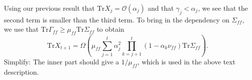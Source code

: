 Using our previous result that $\mathrm{Tr} X_j = \mathcal{O}(\alpha_j)$ and that $\gamma_j < \alpha_j$, we see that the second term is smaller than the third term.
To bring in the dependency on $\Sigma_{ff}$, we use that $\mathrm{Tr} \Gamma_{ff} \geq \mu_{ff} \mathrm{Tr} \Sigma_{ff}$ to obtain
\begin{equation}
    \mathrm{Tr} X_{t+1} = \Omega\left(
    \mu_{ff} \sum_{j=1}^t \alpha_j^2 \prod_{k=j+1}^t \left(1 - \alpha_k \nu_{ff} \right) \mathrm{Tr} \Sigma_{ff}\right) .
\end{equation}
{\color{red}Simplify: The inner part should give a $1/\mu_{ff}$, which is used in the above text description.}